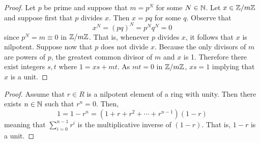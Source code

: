 \documentclass[../AlgebraQualSolutions.tex]{subfiles}
\begin{document}
\begin{proof}
    Let $p$ be prime and suppose that $m = p^N$ for some $N \in \mathbb{N}$. Let $x \in \mathbb{Z}/m\mathbb{Z}$ and suppose first that $p$ divides $x$. Then $x = pq$ for some $q$. Observe that
        \[x^N = (pq)^N = p^Nq^N = 0\]
    since $p^N = m \equiv 0$ in $\mathbb{Z}/m\mathbb{Z}$. That is, whenever $p$ divides $x$, it follows that $x$ is nilpotent. Suppose now that $p$ does not divide $x$. Because the only divisors of $m$ are powers of $p$, the greatest common divisor of $m$ and $x$ is 1. Therefore there exist integers $s,t$ where $1 = xs + mt$. As $mt = 0$ in $\mathbb{Z}/m\mathbb{Z}$, $xs = 1$ implying that $x$ is a unit.
\end{proof}

\begin{proof}
    Assume that $r \in R$ is a nilpotent element of a ring with unity. Then there exists $n \in \mathbb{N}$ such that $r^n = 0$. Then,
        \[1 = 1 - r^n = (1 + r + r^2 + \cdots + r^{n-1})(1-r)\]
    meaning that $\sum_{i=0}^{n-1}r^i$ is the multiplicative inverse of $(1-r)$. That is, $1-r$ is a unit.
\end{proof}
\end{document}
